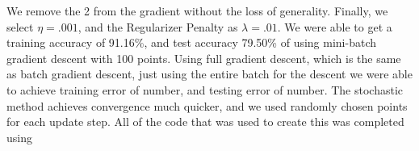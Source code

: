 \documentclass[paper=a4, fontsize=11pt]{scrartcl} %
\begin{document}
We remove the 2 from the gradient without the loss of generality.
Finally, we select $\eta = .001$, and the Regularizer Penalty as $\lambda = .01$.
We were able to get a training accuracy of 91.16\%, and test accuracy 79.50\% of  using mini-batch gradient descent with 100 points.  
Using full gradient descent, which is the same as batch gradient descent, just using the entire batch for the descent we were able to achieve training error of  {\color{red}number}, and testing error of {\color{red}number}.
The stochastic method achieves convergence much quicker, and we used randomly chosen points for each update step.
All of the code that was used to create this was completed using 
\end{document}
